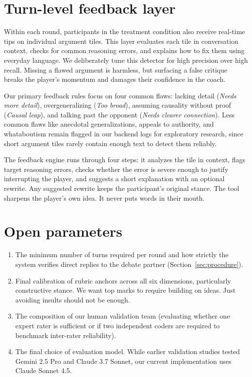 \documentclass[11pt]{article}
\begin{document}
\section{Turn-level feedback layer}
\label{sec:pointlevel}

Within each round, participants in the treatment condition also receive real-time tips on individual argument tiles. This layer evaluates each tile in conversation context, checks for common reasoning errors, and explains how to fix them using everyday language. We deliberately tune this detector for high precision over high recall. Missing a flawed argument is harmless, but surfacing a false critique breaks the player's momentum and damages their confidence in the coach.

Our primary feedback rules focus on four common flaws: lacking detail (\emph{Needs more detail}), overgeneralizing (\emph{Too broad}), assuming causality without proof (\emph{Causal leap}), and talking past the opponent (\emph{Needs clearer connection}). Less common flaws like anecdotal generalizations, appeals to authority, and whataboutism remain flagged in our backend logs for exploratory research, since short argument tiles rarely contain enough text to detect them reliably.

The feedback engine runs through four steps: it analyzes the tile in context, flags target reasoning errors, checks whether the error is severe enough to justify interrupting the player, and suggests a short explanation with an optional rewrite. Any suggested rewrite keeps the participant's original stance. The tool sharpens the player's own idea. It never puts words in their mouth.

\section{Open parameters}
\label{sec:open}

\begin{enumerate}[nosep]
  \item The minimum number of turns required per round and how strictly the system verifies direct replies to the debate partner (Section~\ref{sec:procedure}).
  \item Final calibration of rubric anchors across all six dimensions, particularly constructive stance. We want top marks to require building on ideas. Just avoiding insults should not be enough.
  \item The composition of our human validation team (evaluating whether one expert rater is sufficient or if two independent coders are required to benchmark inter-rater reliability).
  \item The final choice of evaluation model. While earlier validation studies tested Gemini 2.5 Pro and Claude 3.7 Sonnet, our current implementation uses Claude Sonnet 4.5.
\end{enumerate}
\end{document}
